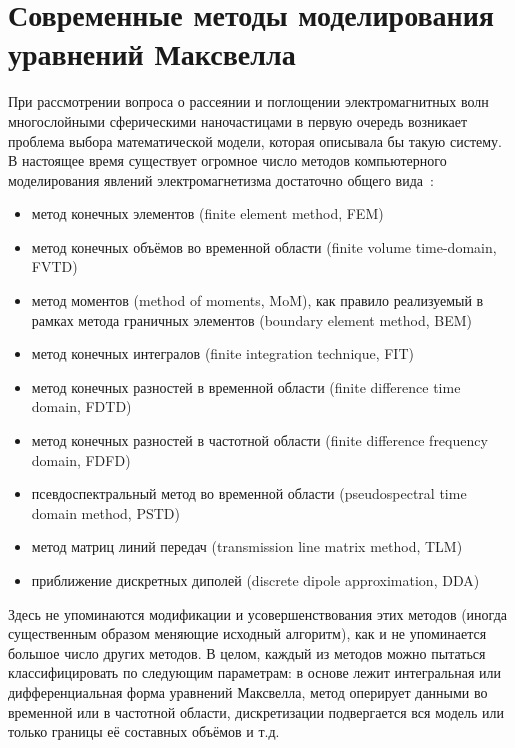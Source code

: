 \section{Современные методы моделирования уравнений Максвелла}
\label{sec:em-methods-intro}
При рассмотрении вопроса о рассеянии и поглощении электромагнитных
волн многослойными сферическими наночастицами в первую очередь
возникает проблема выбора математической модели, которая описывала бы
такую систему.  В настоящее время существует огромное число методов
компьютерного моделирования явлений электромагнетизма достаточно
общего
вида~\cite{Yu-PFDTD-2006,Inan-FDTD-2011,clemson,Bondenson-CEM-2005,Yu-Advanced-FDTD-2011}:
\begin{itemize}
\item метод конечных элементов (finite element method, FEM)
\item метод конечных объёмов во временной области (finite volume
  time-domain, FVTD)
\item метод моментов (method of moments, MoM), как правило реализуемый
  в рамках метода граничных элементов (boundary element method, BEM)
\item метод конечных интегралов (finite integration technique, FIT)
\item метод конечных разностей в временной области (finite difference
  time domain, FDTD)
\item метод конечных разностей в частотной области (finite difference
  frequency domain, FDFD)
\item псевдоспектральный метод во временной области (pseudospectral
  time domain method, PSTD)
\item метод матриц линий передач (transmission line matrix method,
  TLM)
\item приближение дискретных диполей (discrete dipole approximation, DDA)
\end{itemize}
Здесь не упоминаются модификации и усовершенствования этих методов
(иногда существенным образом меняющие исходный алгоритм), как и не
упоминается большое число других методов.  В целом, каждый из методов
можно пытаться классифицировать по следующим параметрам: в основе лежит
интегральная или дифференциальная форма уравнений Максвелла, метод
оперирует данными во временной или в частотной области, дискретизации
подвергается вся модель или только границы её составных объёмов и т.д.

